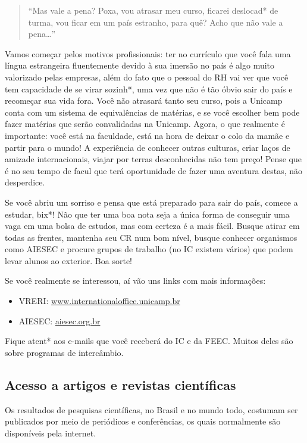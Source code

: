 \begin{quote}
``Mas vale a pena? Poxa, vou atrasar meu curso, ficarei deslocad* de turma, vou
ficar em um país estranho, para quê? Acho que não vale a pena{\dots}''
\end{quote}

Vamos começar pelos motivos profissionais: ter no currículo que você fala uma
língua estrangeira fluentemente devido à sua imersão no país é algo muito
valorizado pelas empresas, além do fato que o pessoal do RH vai ver que você tem
capacidade de se virar sozinh*, uma vez que não é tão óbvio sair do país e
recomeçar sua vida fora. Você não atrasará tanto seu curso, pois a Unicamp conta
com um sistema de equivalências de matérias, e se você escolher bem pode fazer
matérias que serão convalidadas na Unicamp. Agora, o que realmente é importante:
você está na faculdade, está na hora de deixar o colo da mamãe e partir para o
mundo! A experiência de conhecer outras culturas, criar laços de amizade
internacionais, viajar por terras desconhecidas não tem preço! Pense que é no
seu tempo de facul que terá oportunidade de fazer uma aventura destas, não
desperdice.

Se você abriu um sorriso e pensa que está preparado para sair do país, comece a
estudar, bix*! Não que ter uma boa nota seja a única forma de conseguir uma vaga
em uma bolsa de estudos, mas com certeza é a mais fácil.  Busque atirar em todas
as frentes, mantenha seu CR num bom nível, busque conhecer organismos como
AIESEC e procure grupos de trabalho (no IC existem vários) que podem levar
alunos ao exterior. Boa sorte!

Se você realmente se interessou, aí vão uns links com mais informações:

\begin{itemize}
    \item  VRERI: \url{www.internationaloffice.unicamp.br}
    \item  AIESEC: \url{aiesec.org.br}
\end{itemize}

Fique atent* aos e-mails que você receberá do IC e da FEEC. Muitos deles são
sobre programas de intercâmbio.

\subsection{Acesso a artigos e revistas científicas}

Os resultados de pesquisas científicas, no Brasil e no mundo todo, costumam ser
publicados por meio de periódicos e conferências, os quais normalmente são
disponíveis pela internet.

